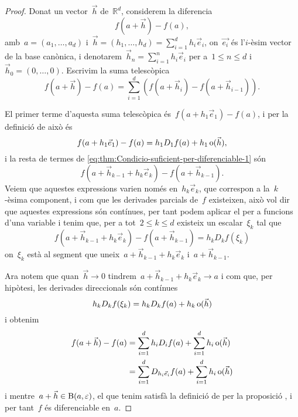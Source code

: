 \documentclass[../../main.tex]{subfiles}
\begin{document}
    \begin{proof}
        Donat un vector~\(\vec{h}\) de~\(\mathbb{R}^{d}\), considerem la diferencia
        \[
            f(a+\vec{h})-f(a),
        \]
        amb~\(a=(a_{1},\dots,a_{d})\) i~\(\vec{h}=(h_{1},\dots,h_{d})=\sum_{i=1}^{d}h_{i}\vec{e}_{i}\), on~\(\vec{e_{i}}\) és l'\(i\)-èsim vector de la base canònica, i denotarem~\(\vec{h}_{n}=\sum_{i=1}^{n}h_{i}\vec{e}_{i}\) per a~\(1\leq n\leq d\) i~\(\vec{h}_{0}=(0,\dots,0)\).
        Escrivim la suma telescòpica
        \begin{equation}\label{eq:thm:Condicio-suficient-per-diferenciable-1}
        f(a+\vec{h})-f(a)=\sum_{i=1}^{d}\left(f(a+\vec{h}_{i})-f(a+\vec{h}_{i-1})\right).
        \end{equation}

        El primer terme d'aquesta suma telescòpica és~\(f(a+h_{1}\vec{e}_{1})-f(a)\), i per la definició de  això és
        \[
            f(a+h_{1}\vec{e}_{1})-f(a)=h_{1}D_{1}f(a)+h_{1}\operatorname{o}(\vec{h}),
        \]
        i la resta de termes de \eqref{eq:thm:Condicio-suficient-per-diferenciable-1} són
        \[
            f(a+\vec{h}_{k-1}+h_{k}\vec{e}_{k})-f(a+\vec{h}_{k-1}).
        \]
        Veiem que aquestes expressions varien només en~\(h_{k}\vec{e}_{k}\), que correspon a la~\(k\)-èsima component, i com que les derivades parcials de~\(f\) existeixen, això vol dir que aquestes expressions són contínues, per tant podem aplicar el  per a funcions d'una variable i tenim que, per a tot~\(2\leq k\leq d\) existeix un escalar~\(\xi_{k}\) tal que
        \[
            f(a+\vec{h}_{k-1}+h_{k}\vec{e}_{k})-f(a+\vec{h}_{k-1})=h_{k}D_{k}f(\xi_{k})
        \]
        on~\(\xi_{k}\) està al segment que uneix~\(a+\vec{h}_{k-1}+h_{k}\vec{e}_{k}\) i~\(a+\vec{h}_{k-1}\).

        Ara notem que quan~\(\vec{h}\to0\) tindrem~\(a+\vec{h}_{k-1}+h_{k}\vec{e}_{k}\to a\) i com que, per hipòtesi, les derivades direccionals són contínues
        \[
            h_{k}D_{k}f(\xi_{k})=h_{k}D_{k}f(a)+h_{k}\operatorname{o}(\vec{h})
        \]
        i obtenim
        \begin{align*}
        f(a+\vec{h})-f(a)&=\sum_{i=1}^{d}h_{i}D_{i}f(a)+\sum_{i=1}^{d}h_{i}\operatorname{o}(\vec{h})\\
        &=\sum_{i=1}^{d}D_{h_{i}\vec{e}_{i}}f(a)+\sum_{i=1}^{d}h_{i}\operatorname{o}(\vec{h})
        \end{align*}
        i mentre~\(a+\vec{h}\in\operatorname{B}(a,\varepsilon)\), el que tenim satisfà la definició de  per la proposició , i per tant~\(f\) és diferenciable en~\(a\).
    \end{proof}
\end{document}
